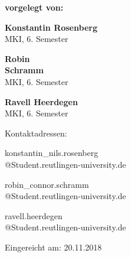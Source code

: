 \begin{titlepage}
\begin{center}
\textbf{vorgelegt von:\\}
\vspace*{0.2cm}
\begin{minipage}[H]{4cm}
\centering
{\large \textbf{Konstantin Rosenberg}}\\
MKI, 6. Semester
\end{minipage}
\hfill
\begin{minipage}[H]{4cm}
\centering
{\large \textbf{Robin\\ Schramm}}\\
MKI, 6. Semester
\end{minipage}
\hfill
\begin{minipage}[H]{4cm}
\centering
{\large \textbf{Ravell Heerdegen}}\\
MKI, 6. Semester
\end{minipage}

\vspace*{0.6cm}

Kontaktadressen:\\

\vspace*{0.1cm}
\begin{minipage}[H]{4cm}
\centering
{\normalsize konstantin\_nils.rosenberg\\@Student.reutlingen-university.de}
\\
\end{minipage}
\hfill
\begin{minipage}[H]{4cm}
\centering
{\normalsize robin\_connor.schramm\\@Student.reutlingen-university.de}\\
\end{minipage}
\hfill
\begin{minipage}[H]{4cm}
\centering
{\normalsize ravell.heerdegen\\@Student.reutlingen-university.de}
\\
\end{minipage}

\vspace*{0.8cm}

Eingereicht am:	20.11.2018



\end{center}

\end{titlepage}